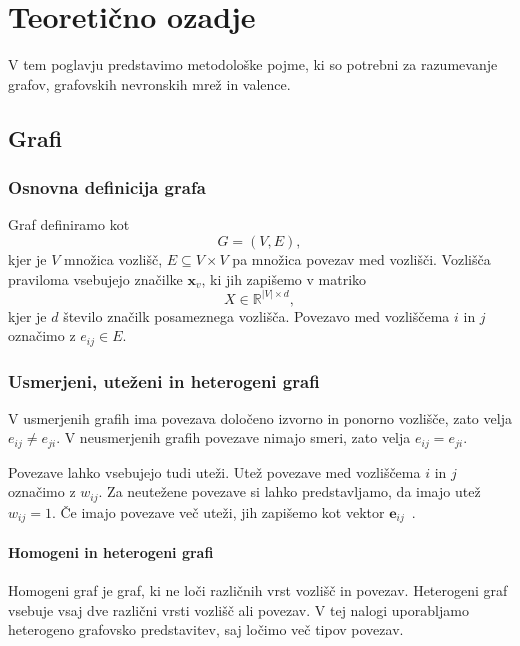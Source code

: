 \chapter{Teoretično ozadje}
\label{sec:ozadje}

V tem poglavju predstavimo metodološke pojme, ki so potrebni za razumevanje grafov, grafovskih nevronskih mrež in valence.

\section{Grafi}
\label{subsec:grafi}
\subsection{Osnovna definicija grafa}

Graf definiramo kot
\begin{equation}
    G = (V, E),
\end{equation}
kjer je $V$ množica vozlišč, $E \subseteq V \times V$ pa množica povezav med vozlišči.
Vozlišča praviloma vsebujejo značilke $\mathbf{x}_v$, ki jih zapišemo v matriko
\begin{equation}
    X \in \mathbb{R}^{|V| \times d},
\end{equation}
kjer je $d$ število značilk posameznega vozlišča.
Povezavo med vozliščema $i$ in $j$ označimo z $e_{ij} \in E$.

\subsection{Usmerjeni, uteženi in heterogeni grafi}

V usmerjenih grafih ima povezava določeno izvorno in ponorno vozlišče, zato velja $e_{ij} \ne e_{ji}$.
V neusmerjenih grafih povezave nimajo smeri, zato velja $e_{ij} = e_{ji}$.

Povezave lahko vsebujejo tudi uteži.
Utež povezave med vozliščema $i$ in $j$ označimo z $w_{ij}$.
Za neutežene povezave si lahko predstavljamo, da imajo utež $w_{ij}=1$.
Če imajo povezave več uteži, jih zapišemo kot vektor $\mathbf{e}_{ij}$~\cite{gilmer2017mpnn}.

\subsubsection{Homogeni in heterogeni grafi}
Homogeni graf je graf, ki ne loči različnih vrst vozlišč in povezav.
Heterogeni graf vsebuje vsaj dve različni vrsti vozlišč ali povezav.
V tej nalogi uporabljamo heterogeno grafovsko predstavitev, saj ločimo več tipov povezav.

